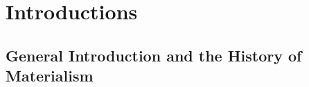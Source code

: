 \chapter{Introductions}

\section*{General Introduction and the History of Materialism}

\lipsum[1-3]
